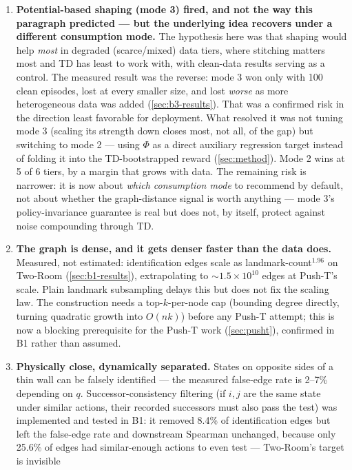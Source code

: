 \documentclass[11pt]{article}
\begin{document}
\begin{enumerate}[leftmargin=1.4em,itemsep=3pt]
\item \textbf{Potential-based shaping (mode 3) fired, and not the way this paragraph predicted ---
but the underlying idea recovers under a different consumption mode.} The hypothesis here was
that shaping would help \emph{most} in degraded (scarce/mixed) data tiers, where stitching matters
most and TD has least to work with, with clean-data results serving as a control. The measured
result was the reverse: mode 3 won only with 100 clean episodes, lost at every smaller size, and
lost \emph{worse} as more heterogeneous data was added (\cref{sec:b3-results}). That was a
confirmed risk in the direction least favorable for deployment. What resolved it was not tuning
mode 3 (scaling its strength down closes most, not all, of the gap) but switching to mode 2 ---
using $\Phi$ as a direct auxiliary regression target instead of folding it into the TD-bootstrapped
reward (\cref{sec:method}). Mode 2 wins at 5 of 6 tiers, by a margin that grows with data. The
remaining risk is narrower: it is now about \emph{which consumption mode} to recommend by
default, not about whether the graph-distance signal is worth anything --- mode 3's
policy-invariance guarantee is real but does not, by itself, protect against noise compounding
through TD.
\item \textbf{The graph is dense, and it gets denser faster than the data does.} Measured, not
estimated: identification edges scale as landmark-count$^{1.96}$ on Two-Room
(\cref{sec:b1-results}), extrapolating to $\sim 1.5\times 10^{10}$ edges at Push-T's scale.
Plain landmark subsampling delays this but does not fix the scaling law. The construction needs
a top-$k$-per-node cap (bounding degree directly, turning quadratic growth into $O(nk)$) before
any Push-T attempt; this is now a blocking prerequisite for the Push-T work (\cref{sec:pusht}),
confirmed in B1 rather than assumed.
\item \textbf{Physically close, dynamically separated.} States on opposite sides of a thin wall
can be falsely identified --- the measured false-edge rate is 2--7\% depending on $q$.
Successor-consistency filtering (if $i,j$ are the same state under similar actions, their
recorded successors must also pass the test) was implemented and tested in B1: it removed 8.4\%
of identification edges but left the false-edge rate and downstream Spearman unchanged, because
only 25.6\% of edges had similar-enough actions to even test --- Two-Room's target is invisible

\end{enumerate}
\end{document}

